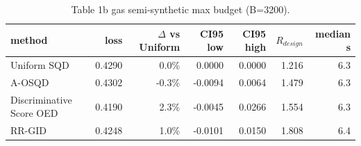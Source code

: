 \begin{table}[t]
\centering
\small
\caption{Table 1b gas semi-synthetic max budget (B=3200).}
\label{tab:Table_1b_gas_semi-synthetic_max_budget_B3200}
\begin{tabular}{lrrrrrr}
\toprule
method & loss & $\Delta$ vs Uniform & CI95 low & CI95 high & $R_{design}$ & median s \\
\midrule
Uniform SQD & 0.4290 & 0.0\% & 0.0000 & 0.0000 & 1.216 & 6.3 \\
A-OSQD & 0.4302 & -0.3\% & -0.0094 & 0.0064 & 1.479 & 6.3 \\
Discriminative Score OED & 0.4190 & 2.3\% & -0.0045 & 0.0266 & 1.554 & 6.3 \\
RR-GID & 0.4248 & 1.0\% & -0.0101 & 0.0150 & 1.808 & 6.4 \\
\bottomrule
\end{tabular}
\end{table}
